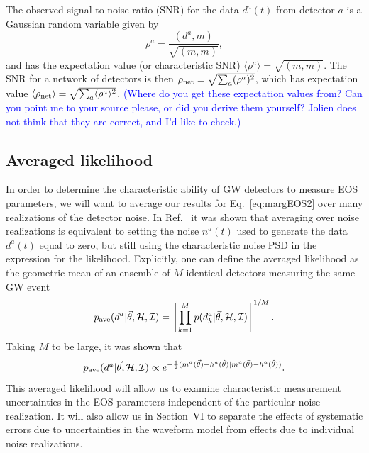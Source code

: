 \documentclass[twocolumn,prd,amssymb,aps,nofootinbib,showpacs,epsf]{revtex4}
\newcommand\les[2]{\textcolor{blue}{{#1}\sout{#2}}}
\begin{document}
The observed signal to noise ratio (SNR) for the data $d^a(t)$ from detector $a$ is a Gaussian random variable given by
\begin{equation}
\rho^a = \frac{(d^a, m)}{\sqrt{(m, m)}},
\end{equation}
and has the expectation value (or characteristic SNR) $\langle \rho^a \rangle = \sqrt{(m, m)}$. The SNR for a network of detectors is then $\rho_{\rm net} = \sqrt{\sum_a(\rho^a)^2}$, which has expectation value $\langle \rho_{\rm net} \rangle = \sqrt{\sum_a\langle \rho^a \rangle^2}$. \les{(Where do you get these expectation values from?  Can you point me to your source please, or did you derive them yourself?  Jolien does not think that they are correct, and I'd like to check.)}{}

\subsection{Averaged likelihood}
\label{sec:averagelike}

In order to determine the characteristic ability of GW detectors to measure EOS parameters, we will want to average our results for Eq.~\eqref{eq:margEOS2} over many realizations of the detector noise. In Ref.~\cite{NissankeHolzHughes2010} it was shown that averaging over noise realizations is equivalent to setting the noise $n^a(t)$ used to generate the data $d^a(t)$ equal to zero, but still using the characteristic noise PSD in the expression for the likelihood. Explicitly, one can define the averaged likelihood as the geometric mean of an ensemble of $M$ identical detectors measuring the same GW event
\begin{equation}
p_{\rm ave}(d^a | \vec\theta, \mathcal{H}, \mathcal{I}) = \left[\prod_{k=1}^M p(d_k^a | \vec\theta, \mathcal{H}, \mathcal{I})\right]^{1/M}.
\end{equation}
Taking $M$ to be large, it was shown that
\begin{equation}
\label{eq:averagedlike}
p_{\rm ave}(d^a | \vec\theta, \mathcal{H}, \mathcal{I}) \propto e^{-\frac{1}{2}(m^a(\vec\theta) - h^a(\hat\theta) | m^a(\vec\theta) - h^a(\hat\theta))}.
\end{equation}
This averaged likelihood will allow us to examine characteristic measurement uncertainties in the EOS parameters independent of the particular noise realization. It will also allow us in Section~VI to separate the effects of systematic errors due to uncertainties in the waveform model from effects due to individual noise realizations.
\end{document}
